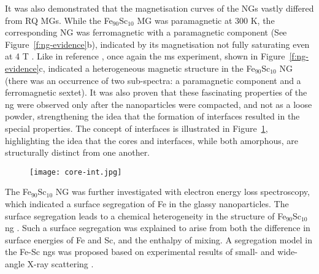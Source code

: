 It was also demonstrated that the magnetisation curves of the NGs vastly differed from RQ MGs. While the Fe$_{90}$Sc$_{10}$ MG was paramagnetic at 300 K, the corresponding NG was ferromagnetic with a paramagnetic component (See Figure~\ref{f:ng-evidence}b), indicated by its magnetisation not fully saturating even at 4 T \cite{Witte2013}. Like in reference \cite{Jing1989}, once again the \gls{ms} experiment, shown in Figure~\ref{f:ng-evidence}c, 
indicated a heterogeneous magnetic structure in the Fe$_{90}$Sc$_{10}$ NG (there was an occurrence of two sub-spectra: a paramagnetic component and a ferromagnetic sextet). It was also proven that these fascinating properties of the \gls{ng} were observed only after the nanoparticles were compacted, and not as a loose powder, strengthening the idea that the formation of interfaces resulted in the special properties. The concept of interfaces is illustrated in Figure~\ref{f:ng-core-int}, highlighting the idea that the cores and interfaces, while both amorphous, are structurally distinct from one another. \par

\begin{figure}[!h] \centering
	\texttt{[image: core-int.jpg]}
	\label{f:ng-core-int}
\end{figure}

The Fe$_{90}$Sc$_{10}$ NG was further investigated with electron energy loss spectroscopy, which indicated a surface segregation of Fe in the glassy nanoparticles. The surface segregation leads to a chemical heterogeneity in the structure of Fe$_{90}$Sc$_{10}$ \gls{ng} \cite{Wang2016}. Such a surface segregation was explained to arise from both the difference in surface energies of Fe and Sc, and the enthalpy of mixing. A segregation model in the Fe-Sc \gls{ng}s was proposed based on experimental results of small- and wide-angle X-ray scattering \cite{Wang2017}. \par

